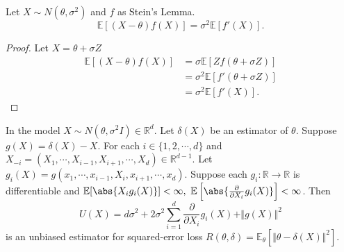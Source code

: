 \documentclass[a4paper]{article}
\begin{document}
\begin{cor}
	Let $X \sim N(\theta,\sigma^2)$ and $f$ as Stein's Lemma.
	\begin{equation}
		\mathbb{E}[(X-\theta)f(X)] = \sigma^2 \mathbb{E}[f'(X)].
	\end{equation}
\end{cor}

\begin{proof}
	Let $X = \theta + \sigma Z$
	\begin{equation}
		\begin{aligned}
			\mathbb{E}[(X-\theta)f(X)] &= \sigma \mathbb{E}[Zf(\theta + \sigma Z)] \\
			&= \sigma^2 \mathbb{E}[f'(\theta + \sigma Z)] \\
			&= \sigma^2 \mathbb{E}[f'(X)].
		\end{aligned}
	\end{equation}
\end{proof}

\begin{thm}
	In the model $X \sim N(\theta,\sigma^2I) \in \mathbb{R}^d$. Let $\delta(X)$ be an estimator of $\theta$. Suppose $g(X) = \delta(X) - X$. For each $i \in \{1,2,\cdots,d\}$ and $X_{-i} = (X_1,\cdots,X_{i-1},X_{i+1},\cdots,X_d) \in \mathbb{R}^{d-1}$. Let $g_i(X) = g(x_1,\cdots,x_{i-1},X_i,x_{i+1},\cdots,x_d)$. Suppose each $g_i: \mathbb{R} \to \mathbb{R}$ is differentiable and $\mathbb{E}[\abs{X_i g_i(X)}] < \infty, \ \mathbb{E}\left[\abs{\frac{\partial}{\partial X_i} g_i(X)}\right] < \infty$. Then
	\begin{equation}
		U(X) = d\sigma^2 + 2\sigma^2\sum\limits_{i=1}^d\frac{\partial}{\partial X_i}g_i(X)+\Vert g(X) \Vert^2
	\end{equation}
	is an unbiased estimator for squared-error loss $R(\theta,\delta) = \mathbb{E}_\theta[\Vert \theta - \delta(X) \Vert ^2]$.
\end{thm}
\end{document}
